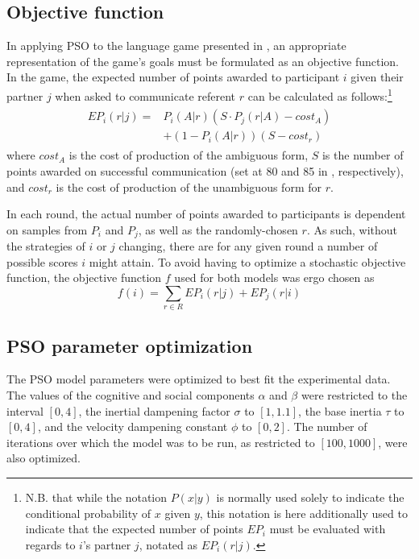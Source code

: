 \documentclass[11pt]{article}
\begin{document}
\subsection{Objective function}
\label{sec:objective_func}
In applying PSO to the language game presented in \cite{rohde2012}, an appropriate representation of the game's goals must be formulated as an objective function. In the game, the expected number of points awarded to participant $i$ given their partner $j$ when asked to communicate referent $r$ can be calculated as follows:\footnote{N.B. that while the notation $P(x|y)$ is normally used solely to indicate the conditional probability of $x$ given $y$, this notation is here additionally used to indicate that the expected number of points $EP_i$ must be evaluated with regards to $i$'s partner $j$, notated as $EP_{i}(r|j)$.}
\begin{multline}
\begin{split}
EP_{i}(r|j) = & P_i(A|r)(S \cdot P_j(r|A) - cost_A) \\
              & + (1 - P_i(A|r))(S - cost_r) 
\end{split}
\end{multline}
where $cost_A$ is the cost of production of the ambiguous form, $S$ is the number of points awarded on successful communication (set at 80 and 85 in \citeauthor{rohde2012}, respectively), and $cost_r$ is the cost of production of the unambiguous form for $r$.

In each round, the actual number of points awarded to participants is dependent on samples from $P_i$ and $P_j$, as well as the randomly-chosen $r$. As such, without the strategies of $i$ or $j$ changing, there are for any given round a number of possible scores $i$ might attain. To avoid having to optimize a stochastic objective function, the objective function $f$ used for both models was ergo chosen as 
\begin{equation}
f(i) = \sum_{r \in R} EP_{i}(r|j) + EP_{j}(r|i)
\end{equation}


\subsection{PSO parameter optimization}
\label{sec:param_opt}
The PSO model parameters were optimized to best fit the experimental data. The values of the cognitive and social components $\alpha$ and $\beta$ were restricted to the interval $[0,4]$, the inertial dampening factor $\sigma$ to $[1,1.1]$, the base inertia $\tau$ to $[0,4]$, and the velocity dampening constant $\phi$ to $[0,2]$. The number of iterations over which the model was to be run, as restricted to $[100,1000]$, were also optimized.
\end{document}
